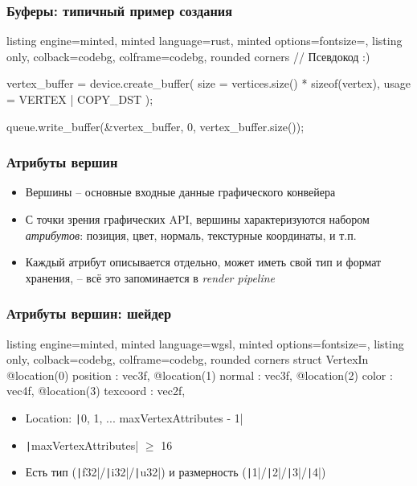 \documentclass[10pt]{beamer}
\begin{document}
\begin{frame}[fragile]
\frametitle{Буферы: типичный пример создания}
\begin{tcblisting}{listing engine=minted, minted language=rust, minted options={fontsize=\scriptsize}, listing only, colback=codebg, colframe=codebg, rounded corners}
// Псевдокод :)

vertex_buffer = device.create_buffer(
    size = vertices.size() * sizeof(vertex),
    usage = VERTEX | COPY_DST
);

queue.write_buffer(&vertex_buffer, 0, vertex_buffer.size());
\end{tcblisting}
\end{frame}

\begin{frame}[fragile]
\frametitle{Атрибуты вершин}
\begin{itemize}
\item Вершины -- основные входные данные графического конвейера
\pause
\item С точки зрения графических API, вершины характеризуются набором \textit{атрибутов}: позиция, цвет, нормаль, текстурные координаты, и т.п.
\pause
\item Каждый атрибут описывается отдельно, может иметь свой тип и формат хранения, -- всё это запоминается в \textit{render pipeline}
\end{itemize}
\end{frame}

\begin{frame}[fragile]
\frametitle{Атрибуты вершин: шейдер}
\begin{tcblisting}{listing engine=minted, minted language=wgsl, minted options={fontsize=\scriptsize}, listing only, colback=codebg, colframe=codebg, rounded corners}
struct VertexIn
{
    @location(0) position : vec3f,
    @location(1) normal : vec3f,
    @location(2) color : vec4f,
    @location(3) texcoord : vec2f,
}
\end{tcblisting}
\pause
{}
\begin{itemize}
\item Location: \texttt|0, 1, ... maxVertexAttributes - 1|
\pause
\item \texttt|maxVertexAttributes| \begin{math}\geq\end{math} 16
\pause
\item Есть тип (\texttt|f32|/\texttt|i32|/\texttt|u32|) и размерность (\texttt|1|/\texttt|2|/\texttt|3|/\texttt|4|)
\end{itemize}
\end{frame}
\end{document}
